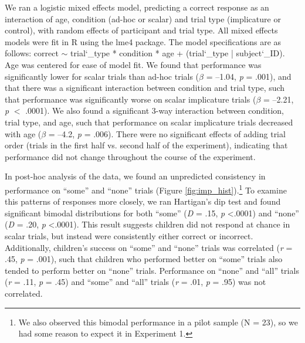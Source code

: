 \documentclass[man]{apa2}
\begin{document}

We ran a logistic mixed effects model, predicting a correct response as an interaction of age, condition (ad-hoc or scalar) and trial type (implicature or control), with random effects of participant and trial type. All mixed effects models were fit in R using the lme4 package. The model specifications are as follows: correct $\sim$ trial\char`_type * condition * age + (trial\char`_type | subject\char`_ID). Age was centered for ease of model fit. We found that performance was significantly lower for scalar trials than ad-hoc trials ($\beta$ = --1.04, \textit{p} = .001), and that there was a significant interaction between condition and trial type, such that performance was significantly worse on scalar implicature trials ($\beta$ = --2.21, \textit{p} $<$ .0001). We also found a significant 3-way interaction between condition, trial type, and age, such that performance on scalar implicature trials decreased with age ($\beta$ = --4.2, \textit{p} = .006). There were no significant effects of adding trial order (trials in the first half vs. second half of the experiment), indicating that performance did not change throughout the course of the experiment.

In post-hoc analysis of the data, we found an unpredicted consistency in performance on ``some'' and ``none'' trials (Figure \ref{fig:imp_hist}).\footnote{We also observed this bimodal performance in a pilot sample (N = 23), so we had some reason to expect it in Experiment 1.}  To examine this patterns of responses more closely, we ran Hartigan's dip test and found significant bimodal distributions for both ``some'' (\textit{D} = .15, \textit{p} \textless  .0001) and ``none'' (\textit{D} = .20, \textit{p} \textless  .0001). This result suggests children did not respond at chance in scalar trials, but instead were consistently either correct or incorrect. Additionally, children's success on ``some'' and ``none'' trials was correlated (\textit{r} = .45, \textit{p} =  .001), such that children who performed better on ``some'' trials also tended to perform better on ``none'' trials. Performance on ``none'' and ``all'' trials (\textit{r} = .11, \textit{p} = .45) and ``some'' and ``all'' trials (\textit{r} = .01, \textit{p} = .95) was not correlated.
\end{document}
